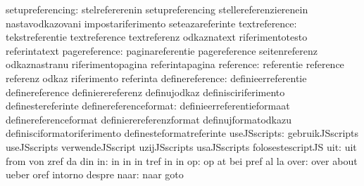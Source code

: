                 setupreferencing: stelrefererenin                  setupreferencing
                                  stellereferenzierenein           nastavodkazovani
                                  impostariferimento               seteazareferinte
                   textreference: tekstreferentie                  textreference
                                  textreferenz                     odkaznatext
                                  riferimentotesto                 referintatext
                   pagereference: paginareferentie                 pagereference
                                  seitenreferenz                   odkaznastranu
                                  riferimentopagina                referintapagina
                       reference: referentie                       reference
                                  referenz                         odkaz
                                  riferimento                      referinta
                 definereference: definieerreferentie              definereference
                                  definierereferenz                definujodkaz
                                  definisciriferimento             definestereferinte
           definereferenceformat: definieerreferentieformaat       definereferenceformat
                                  definierereferenzformat          definujformatodkazu
                                  definisciformatoriferimento      definesteformatreferinte
                    useJSscripts: gebruikJSscripts                 useJSscripts
                                  verwendeJSscript                 uzijJSscripts
                                  usaJSscripts                     folosestescriptJS
                             uit: uit                              from
                                  von                              zref
                                  da                               din
                              in: in                               in
                                  in                               tref
                                  in                               in
                              op: op                               at
                                  bei                              pref
                                  al                               la %
                            over: over                             about
                                  ueber                            oref
                                  intorno                          despre
                            naar: naar                             goto

